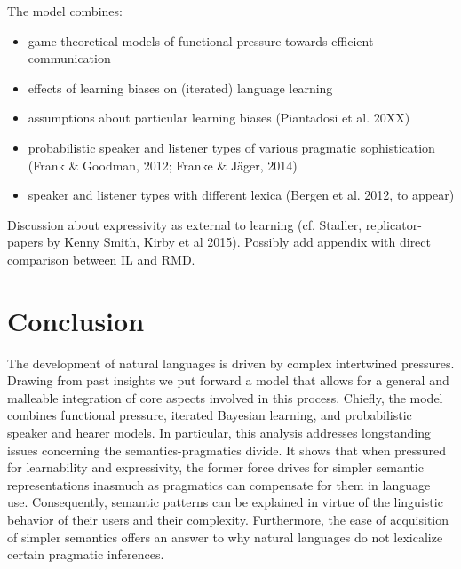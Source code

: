 \documentclass[a4paper]{article}
\newcommand{\hl}[1]{\textcolor[rgb]{.8,.33,.0}{#1}}%
\begin{document}
The model combines:
\begin{itemize}
  \item game-theoretical models of functional pressure towards efficient communication
  \item effects of learning biases on (iterated) language learning
  \item assumptions about particular learning biases (Piantadosi et al. 20XX)
  \item probabilistic speaker and listener types of various pragmatic sophistication (Frank \& Goodman, 2012; Franke \& Jäger, 2014)
  \item speaker and listener types with different lexica (Bergen et al. 2012, to appear)
\end{itemize}

Discussion about expressivity as external to learning (cf. Stadler, replicator-papers by Kenny Smith, Kirby et al 2015). Possibly add appendix with direct comparison between IL and RMD.


\section{Conclusion}


\hl{The development of natural languages is driven by complex intertwined pressures. Drawing from past insights we put forward a model that allows for a general and malleable integration of core aspects involved in this process.  Chiefly, the model combines functional pressure, iterated Bayesian learning, and probabilistic speaker and hearer models.  In particular,  this analysis addresses longstanding issues concerning
the  semantics-pragmatics  divide.   It  shows  that  when  pressured for learnability and expressivity, the former force drives for simpler semantic representations inasmuch as pragmatics can compensate for them in language use.  Consequently, semantic  patterns  can  be  explained  in  virtue  of  the  linguistic behavior  of  their  users  and  their  complexity.   Furthermore, the ease of acquisition of simpler semantics offers an answer to why natural languages do not lexicalize certain pragmatic inferences.}
\end{document}
